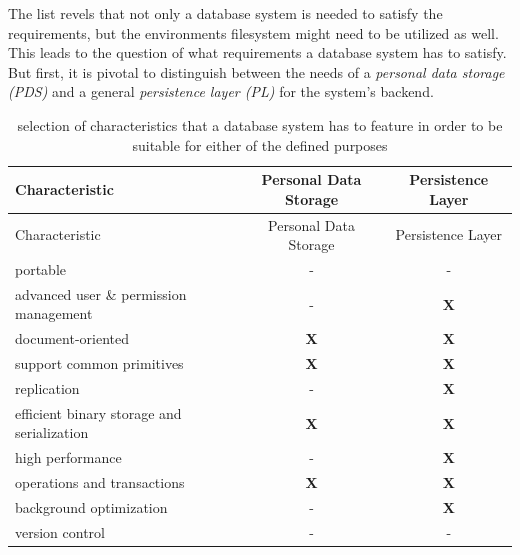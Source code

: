 \documentclass[12pt,english,a4paper,titlepage,cleardoublepage=empty,dottedtoc]{report}
\begin{document}
The list revels that not only a database system is needed to satisfy the
requirements, but the environments filesystem might need to be utilized
as well. This leads to the question of what requirements a database
system has to satisfy. But first, it is pivotal to distinguish between
the needs of a \emph{personal data storage (PDS)} and a general
\emph{persistence layer (PL)} for the system's backend.

\begin{longtable}[]{@{}lcc@{}}
\caption{selection of characteristics that a database system has to
feature in order to be suitable for either of the defined purposes
\label{tbl:dbs-features}}\tabularnewline
\toprule
Characteristic & Personal Data Storage & Persistence
Layer\tabularnewline
\midrule
\endfirsthead
\toprule
Characteristic & Personal Data Storage & Persistence
Layer\tabularnewline
\midrule
\endhead
portable & - & -\tabularnewline
advanced user \& permission management & - & \textbf{X}\tabularnewline
document-oriented & \textbf{X} & \textbf{X}\tabularnewline
support common primitives & \textbf{X} & \textbf{X}\tabularnewline
replication & - & \textbf{X}\tabularnewline
efficient binary storage and serialization & \textbf{X} &
\textbf{X}\tabularnewline
high performance & - & \textbf{X}\tabularnewline
operations and transactions & \textbf{X} & \textbf{X}\tabularnewline
background optimization & - & \textbf{X}\tabularnewline
version control & - & -\tabularnewline
\bottomrule
\end{longtable}
\end{document}
